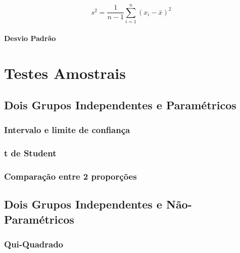 \documentclass[
]{book}
\begin{document}
\begin{equation}
s^2 =  \frac{1}{n-1}\sum_{i=1}^n(x_i - \bar{x})^2
\end{equation}

\hypertarget{desvio-padruxe3o}{%
\subsection{Desvio Padrão}\label{desvio-padruxe3o}}

\hypertarget{part-testes-amostrais}{%
\part{Testes Amostrais}\label{part-testes-amostrais}}

\hypertarget{dois-grupos-independentes-e-paramuxe9tricos}{%
\chapter{Dois Grupos Independentes e Paramétricos}\label{dois-grupos-independentes-e-paramuxe9tricos}}

\hypertarget{intervalo-e-limite-de-confianuxe7a}{%
\section{Intervalo e limite de confiança}\label{intervalo-e-limite-de-confianuxe7a}}

\hypertarget{t-de-student}{%
\section{t de Student}\label{t-de-student}}

\hypertarget{comparauxe7uxe3o-entre-2-proporuxe7uxf5es}{%
\section{Comparação entre 2 proporções}\label{comparauxe7uxe3o-entre-2-proporuxe7uxf5es}}

\hypertarget{dois-grupos-independentes-e-nuxe3o-paramuxe9tricos}{%
\chapter{Dois Grupos Independentes e Não-Paramétricos}\label{dois-grupos-independentes-e-nuxe3o-paramuxe9tricos}}

\hypertarget{qui-quadrado}{%
\section{Qui-Quadrado}\label{qui-quadrado}}
\end{document}
